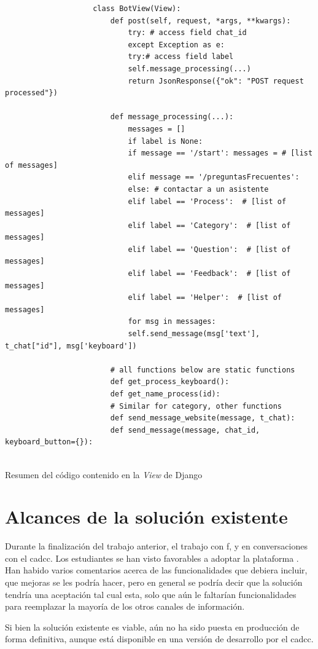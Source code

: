             \begin{listing}
                \begin{verbatim}
                    class BotView(View):
                        def post(self, request, *args, **kwargs):
                            try: # access field chat_id
                            except Exception as e:
                            try:# access field label
                            self.message_processing(...)
                            return JsonResponse({"ok": "POST request processed"})
        
                        def message_processing(...):
                            messages = []
                            if label is None:
                            if message == '/start': messages = # [list of messages]
                            elif message == '/preguntasFrecuentes':
                            else: # contactar a un asistente
                            elif label == 'Process':  # [list of messages]
                            elif label == 'Category':  # [list of messages]
                            elif label == 'Question':  # [list of messages]
                            elif label == 'Feedback':  # [list of messages]
                            elif label == 'Helper':  # [list of messages]
                            for msg in messages:
                            self.send_message(msg['text'], t_chat["id"], msg['keyboard'])
        
                        # all functions below are static functions
                        def get_process_keyboard():
                        def get_name_process(id):
                        # Similar for category, other functions
                        def send_message_website(message, t_chat):
                        def send_message(message, chat_id, keyboard_button={}):
                    
                \end{verbatim}
                 \caption[View sistema anterior]{Resumen del código contenido en la \textit{View} de \gls{Django}}
                 \label{list:view}
            \end{listing}
        

\section{Alcances de la solución existente}
    \par Durante la finalización del trabajo anterior, el trabajo con \acrlong{f}, y en conversaciones con el \acrlong{cadcc}. Los estudiantes se han visto favorables a adoptar la plataforma \cite{ARANCIBIA2021}. Han habido varios comentarios acerca de las funcionalidades que debiera incluir, que mejoras se les podría hacer, pero en general se podría decir que la solución tendría una aceptación tal cual esta, solo que aún le faltarían funcionalidades para reemplazar la mayoría de los otros canales de información.
    \par Si bien la solución existente es viable, aún no ha sido puesta en producción de forma definitiva, aunque está disponible en una versión de desarrollo por el \acrshort{cadcc}.
    
